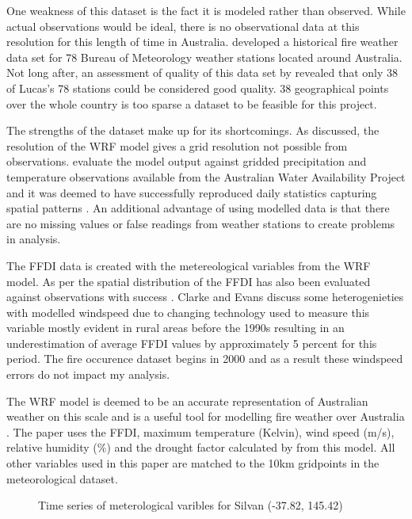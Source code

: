 \documentclass{article}
\begin{document}
One weakness of this dataset is the fact it is modeled rather than observed. While actual observations would be ideal, there is no observational data at this resolution for this length of time in Australia. \citet{lucas10} developed a historical fire weather data set for 78 Bureau of Meteorology weather stations located around Australia. Not long after, an assessment of quality of this data set by \citet{clarke2013} revealed that only 38 of Lucas's 78 stations could be considered good quality. 38 geographical points over the whole country is too sparse a dataset to be feasible for this project. 

The strengths of the dataset make up for its shortcomings. As discussed, the resolution of the WRF model gives a grid resolution not possible from observations. \citet{evans10} evaluate the model output against gridded precipitation and temperature observations available from the Australian Water Availability Project and it was deemed to have successfully reproduced daily statistics capturing spatial patterns  \citep{evans10, clarkeevans13}. An additional advantage of using modelled data is that there are no missing values or false readings from weather stations to create problems in analysis. 

The FFDI data is created with the metereological variables from the WRF model. As per \citet{clarkeevans13} the spatial distribution of the FFDI has also been evaluated against observations with success  \citep{sanabria13}. Clarke and Evans discuss some heterogenieties with modelled windspeed due to changing technology used to measure this variable mostly evident in rural areas before the 1990s resulting in an underestimation of average FFDI values by approximately 5 percent for this period. The fire occurence dataset begins in 2000 and as a result these windspeed errors do not impact my analysis.

The WRF model \citep{evans10} is deemed to be an accurate representation of Australian weather on this scale and is a useful tool for modelling fire weather over Australia \citep{clarke2013}. The paper uses the FFDI, maximum temperature (Kelvin), wind speed (m/s), relative humidity (\%) and the drought factor calculated by \citet{clarke2013}  from this model. All other variables used in this paper are matched to the 10km gridpoints in the meteorological dataset. 

\begin{figure}[h]
	\centering 
	\caption{Time series of meterological varibles for Silvan (-37.82, 145.42)} 
	\label{fig:silv} 
\end{figure}
\end{document}
